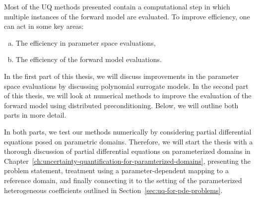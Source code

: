 Most of the UQ methods presented contain a computational step in which multiple instances of the forward model are evaluated.
To improve efficiency, one can act in some key areas:
\begin{enumerate}[a)]
    \item The efficiency in parameter space evaluations,
    \item The efficiency of the forward model evaluations.
\end{enumerate}
In the first part of this thesis, we will discuss improvements in the parameter space evaluations by discussing polynomial surrogate models.
In the second part of this thesis, we will look at numerical methods to improve the evaluation of the forward model using distributed preconditioning.
Below, we will outline both parts in more detail.

In both parts, we test our methods numerically by considering partial differential equations posed on parametric domains.
Therefore, we will start the thesis with a thorough discussion of partial differential equations on parameterized domains in Chapter~\ref{ch:uncertainty-quantification-for-paramterized-domains}, presenting the problem statement, treatment using a parameter-dependent mapping to a reference domain, and finally connecting it to the setting of the parameterized heterogeneous coefficients outlined in Section~\ref{sec:uq-for-pde-problems}.

